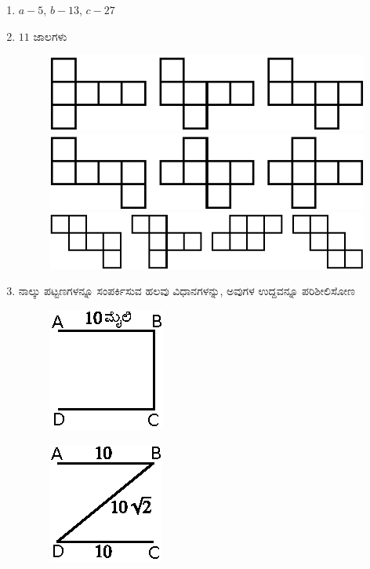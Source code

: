 \begin{enumerate}
\item $a - 5$, $b - 13$, $c - 27$

\item $11$ ಜಾಲಗಳು 
\begin{figure}[H]
\centering
\includegraphics[scale =1.3]{images/chap3/ans22a.eps}

\medskip
\includegraphics[scale =1.3]{images/chap3/ans22b.eps}

\medskip
\includegraphics[scale =1.2]{images/chap3/ans22c.eps}
\end{figure}

\eject

\item ನಾಲ್ಕು ಪಟ್ಟಣಗಳನ್ನೂ ಸಂಪರ್ಕಿಸುವ ಹಲವು ವಿಧಾನಗಳನ್ನು, ಅವುಗಳ ಉದ್ದವನ್ನೂ ಪರಿಶೀಲಿಸೋಣ

\begin{minipage}[c]{4.5cm}
\begin{figure}[H]
\centering
\includegraphics{images/chap3/ans23a.eps}
{\fontsize{9pt}{11pt}\selectfont{}}\relax
\end{figure}
\end{minipage}
\begin{minipage}[c]{4.5cm}
\begin{figure}[H]
\centering
\includegraphics{images/chap3/ans23b.eps}


\end{figure}
\end{minipage}
\end{enumerate}
